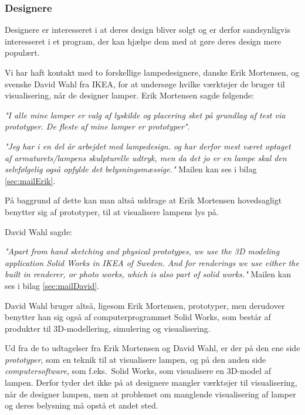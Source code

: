 \subsubsection{Designere}
Designere er interesseret i at deres design bliver solgt og er derfor sandsynligvis interesseret i et program, der kan hjælpe dem med at gøre deres design mere populært.
 
Vi har haft kontakt med to forskellige lampedesignere, danske Erik Mortensen, og svenske David Wahl fra IKEA, for at undersøge hvilke værktøjer de bruger til visualisering, når de designer lamper. Erik Mortensen sagde følgende: 
\begin{center}
\textit{"I alle mine lamper er valg af lyskilde og placering sket på grundlag af test via prototyper. De fleste af mine lamper er prototyper"}.

\textit{"Jeg har i en del år arbejdet med lampedesign. og har derfor mest været optaget af armaturets/lampens skulpturelle udtryk, men da det jo er en lampe skal den selvfølgelig  også opfylde det belysningsmæssige."} Mailen kan ses i bilag \ref{sec:mailErik}.
\end{center}

På baggrund af dette kan man altså uddrage at Erik Mortensen hovedsagligt benytter sig af prototyper, til at visualisere lampens lys på.

David Wahl sagde:
\begin{center}
\textit{"Apart from hand sketching and physical prototypes, we use the 3D modeling application Solid Works in IKEA of Sweden. And for renderings we use either the built in renderer, or photo works, which is also part of solid works."} Mailen kan ses i bilag \ref{sec:mailDavid}.
\end{center}

David Wahl bruger altså, ligesom Erik Mortensen, prototyper, men derudover benytter han sig også af computerprogrammet Solid Works, som består af produkter til 3D-modellering, simulering og visualisering\cite{solidworks}.

Ud fra de to udtagelser fra Erik Mortensen og David Wahl, er der på den ene side \textit{prototyper}, som en teknik til at visualisere lampen, og på den anden side \textit{computersoftware}, som f.eks.\ Solid Works, som visualisere en 3D-model af lampen. Derfor tyder det ikke på at designere mangler værktøjer til visualisering, når de designer lampen, men at problemet om manglende visualisering af lamper og deres belysning må opstå et andet sted.

